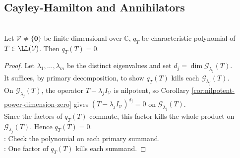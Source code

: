 \subsection{Cayley-Hamilton and Annihilators}

\begin{theorem} \label{thm:cayley-hamilton-operator} \\
Let $\mathcal{V}\neq\{\mathbf{0}\}$ be finite-dimensional over $\mathbb{C}$, $q_T$ be characteristic polynomial of $T\in\LL(\mathcal{V})$. Then $q_T(T)=0$.
\begin{proof}
Let $\lambda_1,\ldots,\lambda_m$ be the distinct eigenvalues and set $d_j=\dim \mathcal{G}_{\lambda_j}(T)$.\\
It suffices, by primary decomposition, to show $q_T(T)$ kills each $\mathcal{G}_{\lambda_j}(T)$.\\
On $\mathcal{G}_{\lambda_j}(T)$, the operator $T-\lambda_jI_{\mathcal{V}}$ is nilpotent, so Corollary \ref{cor:nilpotent-power-dimension-zero} gives $(T-\lambda_jI_{\mathcal{V}})^{d_j}=0$ on $\mathcal{G}_{\lambda_j}(T)$.\\
Since the factors of $q_T(T)$ commute, this factor kills the whole product on $\mathcal{G}_{\lambda_j}(T)$. Hence $q_T(T)=0$.\\
: Check the polynomial on each primary summand.\\
: One factor of $q_T(T)$ kills each summand.
\end{proof}
\end{theorem}

